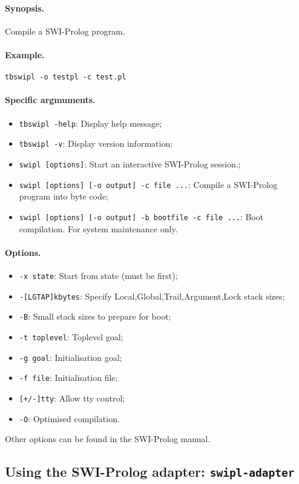 \paragraph{Synopsis.} Compile a SWI-Prolog program.

\paragraph{Example.} {\tt tbswipl -o testpl -c test.pl}

\paragraph{Specific argmuments.}
\begin{itemize}
  \item {\tt tbswipl -help}: Display help message;
  \item {\tt tbswipl -v}:    Display version information;
  \item {\tt swipl [options]}: Start an interactive SWI-Prolog session.;
  \item {\tt swipl [options] [-o output] -c file ...}:
	Compile a SWI-Prolog program into byte code;
  \item {\tt swipl [options] [-o output] -b bootfile -c file ...}:
        Boot compilation. For system maintenance only.
\end{itemize}

\paragraph{Options.}
\begin{itemize}
 \item {\tt -x state}: Start from state (must be first);
 \item {\tt -[LGTAP]kbytes}: Specify {Local,Global,Trail,Argument,Lock} stack sizes;
 \item {\tt -B}: Small stack sizes to prepare for boot;
 \item {\tt -t toplevel}: Toplevel goal;
 \item {\tt -g goal}: Initialisation goal;
 \item {\tt -f file}: Initialisation file;
 \item {\tt [+/-]tty}: Allow tty control;
 \item {\tt -O}: Optimised compilation.
\end{itemize}
Other options can be found in the SWI-Prolog manual.

\subsection{\label{using-swipl}Using the SWI-Prolog adapter: 
{\tt swipl-adapter}}

